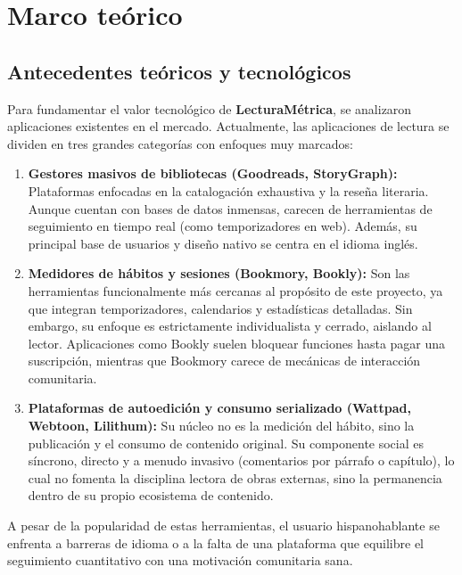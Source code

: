\documentclass[12pt, atypical, journal]{article}
\begin{document}
\section{Marco teórico}

\subsection{Antecedentes teóricos y tecnológicos}

Para fundamentar el valor tecnológico de \textbf{LecturaMétrica}, se analizaron aplicaciones existentes en el mercado. Actualmente, las aplicaciones de lectura se dividen en tres grandes categorías con enfoques muy marcados:

\begin{enumerate}
    \item \textbf{Gestores masivos de bibliotecas (Goodreads, StoryGraph):} Plataformas enfocadas en la catalogación exhaustiva y la reseña literaria. Aunque cuentan con bases de datos inmensas, carecen de herramientas de seguimiento en tiempo real (como temporizadores en web). Además, su principal base de usuarios y diseño nativo se centra en el idioma inglés.
    \item \textbf{Medidores de hábitos y sesiones (Bookmory, Bookly):} Son las herramientas funcionalmente más cercanas al propósito de este proyecto, ya que integran temporizadores, calendarios y estadísticas detalladas. Sin embargo, su enfoque es estrictamente individualista y cerrado, aislando al lector. Aplicaciones como Bookly suelen bloquear funciones hasta pagar una suscripción, mientras que Bookmory carece de mecánicas de interacción comunitaria.
    \item \textbf{Plataformas de autoedición y consumo serializado (Wattpad, Webtoon, Lilithum):} Su núcleo no es la medición del hábito, sino la publicación y el consumo de contenido original. Su componente social es síncrono, directo y a menudo invasivo (comentarios por párrafo o capítulo), lo cual no fomenta la disciplina lectora de obras externas, sino la permanencia dentro de su propio ecosistema de contenido.
\end{enumerate}

A pesar de la popularidad de estas herramientas, el usuario hispanohablante se enfrenta a barreras de idioma o a la falta de una plataforma que equilibre el seguimiento cuantitativo con una motivación comunitaria sana.
\end{document}
